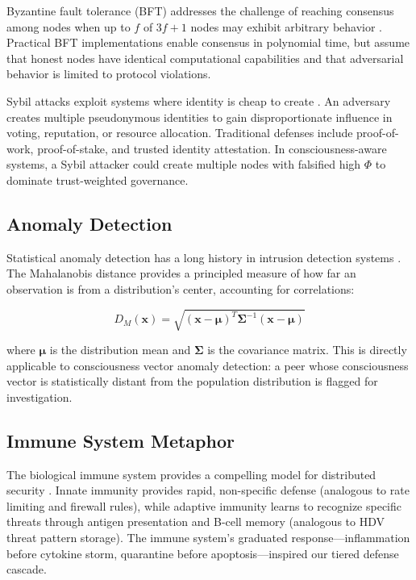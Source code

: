 \documentclass[11pt,a4paper]{article}
\begin{document}
Byzantine fault tolerance (BFT) addresses the challenge of reaching consensus among nodes when up to $f$ of $3f+1$ nodes may exhibit arbitrary behavior \citep{lamport1982}. Practical BFT implementations \citep{castro1999} enable consensus in polynomial time, but assume that honest nodes have identical computational capabilities and that adversarial behavior is limited to protocol violations.

Sybil attacks exploit systems where identity is cheap to create \citep{douceur2002}. An adversary creates multiple pseudonymous identities to gain disproportionate influence in voting, reputation, or resource allocation. Traditional defenses include proof-of-work, proof-of-stake, and trusted identity attestation. In consciousness-aware systems, a Sybil attacker could create multiple nodes with falsified high $\Phi$ to dominate trust-weighted governance.

\subsection{Anomaly Detection}

Statistical anomaly detection has a long history in intrusion detection systems \citep{anderson2003}. The Mahalanobis distance provides a principled measure of how far an observation is from a distribution's center, accounting for correlations:

\begin{equation}
D_M(\mathbf{x}) = \sqrt{(\mathbf{x} - \boldsymbol{\mu})^T \boldsymbol{\Sigma}^{-1} (\mathbf{x} - \boldsymbol{\mu})}
\end{equation}

where $\boldsymbol{\mu}$ is the distribution mean and $\boldsymbol{\Sigma}$ is the covariance matrix. This is directly applicable to consciousness vector anomaly detection: a peer whose consciousness vector is statistically distant from the population distribution is flagged for investigation.

\subsection{Immune System Metaphor}

The biological immune system provides a compelling model for distributed security \citep{forrest1994}. Innate immunity provides rapid, non-specific defense (analogous to rate limiting and firewall rules), while adaptive immunity learns to recognize specific threats through antigen presentation and B-cell memory (analogous to HDV threat pattern storage). The immune system's graduated response---inflammation before cytokine storm, quarantine before apoptosis---inspired our tiered defense cascade.
\end{document}
